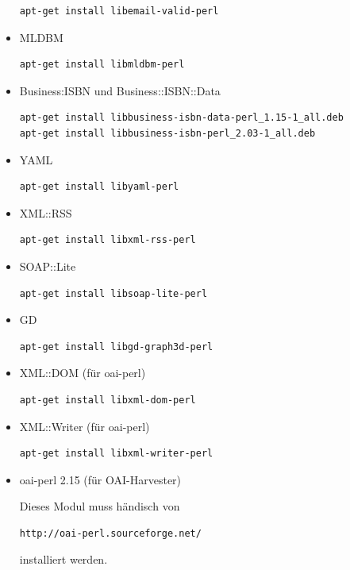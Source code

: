 \documentclass[11pt, twoside, a4paper, BCOR8mm, DIV12, bibtotoc,idxtotoc]{scrbook}
\begin{document}
\begin{itemize}
\begin{verbatim}
apt-get install libemail-valid-perl
\end{verbatim}
\item MLDBM
\begin{verbatim}
apt-get install libmldbm-perl
\end{verbatim}
\item Business:ISBN und Business::ISBN::Data
\begin{verbatim}
apt-get install libbusiness-isbn-data-perl_1.15-1_all.deb
apt-get install libbusiness-isbn-perl_2.03-1_all.deb
\end{verbatim}
\item YAML
\begin{verbatim}
apt-get install libyaml-perl
\end{verbatim}
\item XML::RSS
\begin{verbatim}
apt-get install libxml-rss-perl
\end{verbatim}
\item SOAP::Lite
\begin{verbatim}
apt-get install libsoap-lite-perl
\end{verbatim}
\item GD
\begin{verbatim}
apt-get install libgd-graph3d-perl
\end{verbatim}
\item XML::DOM (für oai-perl)
\begin{verbatim}
apt-get install libxml-dom-perl
\end{verbatim}
\item XML::Writer (für oai-perl)
\begin{verbatim}
apt-get install libxml-writer-perl
\end{verbatim}
\item oai-perl 2.15 (für OAI-Harvester)

Dieses Modul muss händisch von
\begin{verbatim}
http://oai-perl.sourceforge.net/
\end{verbatim}
installiert werden.



\end{itemize}
\end{document}
